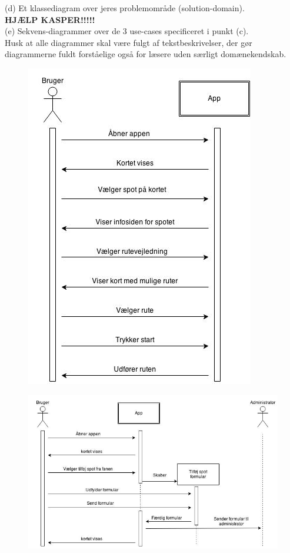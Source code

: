 \documentclass[12pt]{article}
\begin{document}
(d) Et klassediagram over jeres problemområde (solution-domain).\\
\textbf{HJÆLP KASPER!!!!!}\\
(e) Sekvens-diagrammer over de 3 use-cases specificeret i punkt (c).\\
Husk at alle diagrammer skal være fulgt af tekstbeskrivelser, der gør diagrammerne fuldt
forståelige også for læsere uden særligt domænekendskab.\\
\begin{figure}[h]
\includegraphics[scale = 0.4]{rutevejledning}
\end{figure}

\begin{figure}[h]
\includegraphics[scale = 0.4]{addspotdia}
\end{figure}
\end{document}
